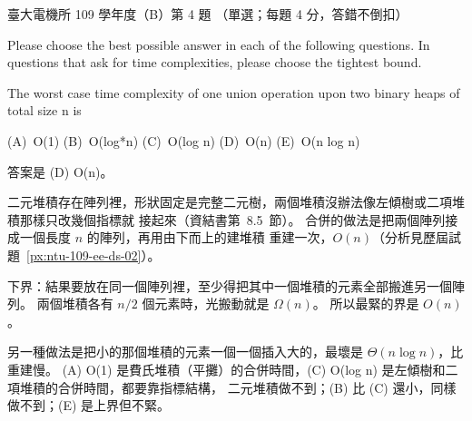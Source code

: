 \begin{pastexam}[label={px:ntu-109-ee-ds-04}]{臺大電機所 109 學年度（B）第 4 題}
（單選；每題 4 分，答錯不倒扣）

Please choose the best possible answer in each of the following questions. In questions that ask
for time complexities, please choose the tightest bound.

The worst case time complexity of one union operation upon two binary heaps of total size n is

(A)~O(1) \qquad (B)~O(log*n) \qquad (C)~O(log n) \qquad (D)~O(n) \qquad (E)~O(n log n)
\end{pastexam}

\begin{pastsoln}
答案是 (D) O(n)。

二元堆積存在陣列裡，形狀固定是完整二元樹，兩個堆積沒辦法像左傾樹或二項堆積那樣只改幾個指標就
接起來（資結書第~8.5~節）。 合併的做法是把兩個陣列接成一個長度 $n$ 的陣列，再用由下而上的建堆積
重建一次，$O(n)$（分析見歷屆試題~\ref{px:ntu-109-ee-ds-02}）。

下界：結果要放在同一個陣列裡，至少得把其中一個堆積的元素全部搬進另一個陣列。 兩個堆積各有
$n/2$ 個元素時，光搬動就是 $\Omega(n)$。 所以最緊的界是 $O(n)$。

另一種做法是把小的那個堆積的元素一個一個插入大的，最壞是 $\Theta(n \log n)$，比重建慢。
(A) O(1) 是費氏堆積（平攤）的合併時間，(C) O(log n) 是左傾樹和二項堆積的合併時間，都要靠指標結構，
二元堆積做不到；(B) 比 (C) 還小，同樣做不到；(E) 是上界但不緊。
\end{pastsoln}
